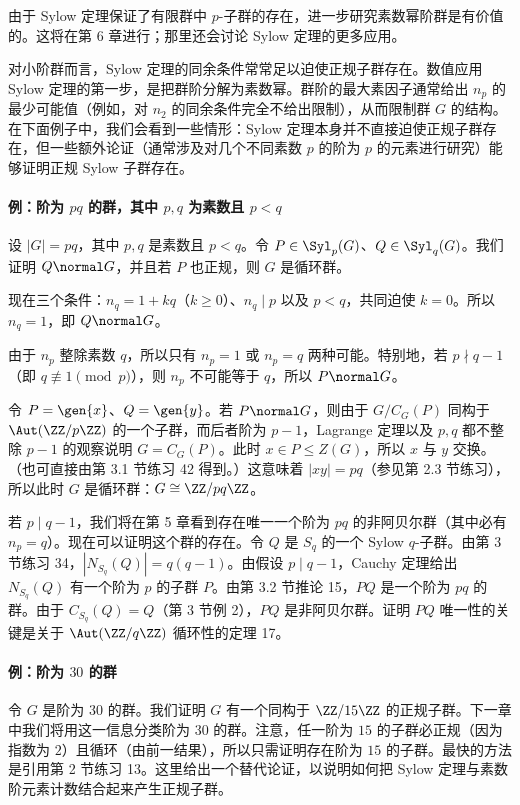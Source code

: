 由于 Sylow 定理保证了有限群中 $p$-子群的存在，进一步研究素数幂阶群是有价值的。这将在第 6 章进行；那里还会讨论 Sylow 定理的更多应用。

对小阶群而言，Sylow 定理的同余条件常常足以迫使正规子群存在。数值应用 Sylow 定理的第一步，是把群阶分解为素数幂。群阶的最大素因子通常给出 $n_p$ 的最少可能值（例如，对 $n_2$ 的同余条件完全不给出限制），从而限制群 $G$ 的结构。在下面例子中，我们会看到一些情形：Sylow 定理本身并不直接迫使正规子群存在，但一些额外论证（通常涉及对几个不同素数 $p$ 的阶为 $p$ 的元素进行研究）能够证明正规 Sylow 子群存在。

\paragraph{例：阶为 $pq$ 的群，其中 $p,q$ 为素数且 $p<q$}
设 $|G|=pq$，其中 $p,q$ 是素数且 $p<q$。令 $P\in\Syl_p(G)$、$Q\in\Syl_q(G)$。我们证明 $Q\normal G$，并且若 $P$ 也正规，则 $G$ 是循环群。

现在三个条件：$n_q=1+kq$（$k\geq0$）、$n_q\mid p$ 以及 $p<q$，共同迫使 $k=0$。所以 $n_q=1$，即 $Q\normal G$。

由于 $n_p$ 整除素数 $q$，所以只有 $n_p=1$ 或 $n_p=q$ 两种可能。特别地，若 $p\nmid q-1$（即 $q\not\equiv1\pmod p$），则 $n_p$ 不可能等于 $q$，所以 $P\normal G$。

令 $P=\gen{x}$、$Q=\gen{y}$。若 $P\normal G$，则由于 $G/C_G(P)$ 同构于 $\Aut(\ZZ/p\ZZ)$ 的一个子群，而后者阶为 $p-1$，Lagrange 定理以及 $p,q$ 都不整除 $p-1$ 的观察说明 $G=C_G(P)$。此时 $x\in P\leq Z(G)$，所以 $x$ 与 $y$ 交换。（也可直接由第 3.1 节练习 42 得到。）这意味着 $|xy|=pq$（参见第 2.3 节练习），所以此时 $G$ 是循环群：$G\cong\ZZ/pq\ZZ$。

若 $p\mid q-1$，我们将在第 5 章看到存在唯一一个阶为 $pq$ 的非阿贝尔群（其中必有 $n_p=q$）。现在可以证明这个群的存在。令 $Q$ 是 $S_q$ 的一个 Sylow $q$-子群。由第 3 节练习 34，$|N_{S_q}(Q)|=q(q-1)$。由假设 $p\mid q-1$，Cauchy 定理给出 $N_{S_q}(Q)$ 有一个阶为 $p$ 的子群 $P$。由第 3.2 节推论 15，$PQ$ 是一个阶为 $pq$ 的群。由于 $C_{S_q}(Q)=Q$（第 3 节例 2），$PQ$ 是非阿贝尔群。证明 $PQ$ 唯一性的关键是关于 $\Aut(\ZZ/q\ZZ)$ 循环性的定理 17。

\paragraph{例：阶为 $30$ 的群}
令 $G$ 是阶为 $30$ 的群。我们证明 $G$ 有一个同构于 $\ZZ/15\ZZ$ 的正规子群。下一章中我们将用这一信息分类阶为 $30$ 的群。注意，任一阶为 $15$ 的子群必正规（因为指数为 $2$）且循环（由前一结果），所以只需证明存在阶为 $15$ 的子群。最快的方法是引用第 2 节练习 13。这里给出一个替代论证，以说明如何把 Sylow 定理与素数阶元素计数结合起来产生正规子群。

